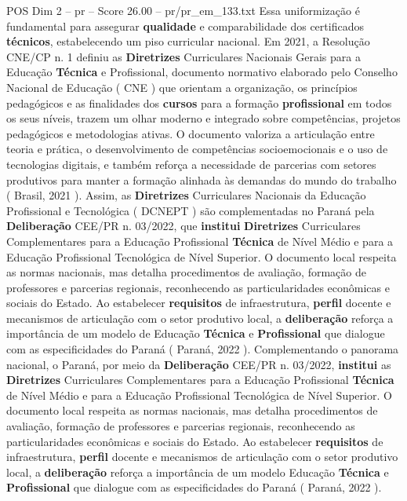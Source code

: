 \begin{textsample}{POS Dim 2 – pr – Score 26.00 – pr/pr\_em\_133.txt}
Essa uniformização é fundamental para assegurar \textbf{qualidade} e comparabilidade dos certificados \textbf{técnicos}, estabelecendo um piso curricular nacional.
Em 2021, a Resolução CNE/CP n. 1 definiu as \textbf{Diretrizes} Curriculares Nacionais Gerais para a Educação \textbf{Técnica} e Profissional, documento normativo elaborado pelo Conselho Nacional de Educação ( CNE ) que orientam a organização, os princípios pedagógicos e as finalidades dos \textbf{cursos} para a formação \textbf{profissional} em todos os seus níveis, trazem um olhar moderno e integrado sobre competências, projetos pedagógicos e metodologias ativas.
O documento valoriza a articulação entre teoria e prática, o desenvolvimento de competências socioemocionais e o uso de tecnologias digitais, e também reforça a necessidade de parcerias com setores produtivos para manter a formação alinhada às demandas do mundo do trabalho ( Brasil, 2021 ).
Assim, as \textbf{Diretrizes} Curriculares Nacionais da Educação Profissional e Tecnológica ( DCNEPT ) são complementadas no Paraná pela \textbf{Deliberação} CEE/PR n. 03/2022, que \textbf{institui} \textbf{Diretrizes} Curriculares Complementares para a Educação Profissional \textbf{Técnica} de Nível Médio e para a Educação Profissional Tecnológica de Nível Superior.
O documento local respeita as normas nacionais, mas detalha procedimentos de avaliação, formação de professores e parcerias regionais, reconhecendo as particularidades econômicas e sociais do Estado.
Ao estabelecer \textbf{requisitos} de infraestrutura, \textbf{perfil} docente e mecanismos de articulação com o setor produtivo local, a \textbf{deliberação} reforça a importância de um modelo de Educação \textbf{Técnica} e \textbf{Profissional} que dialogue com as especificidades do Paraná ( Paraná, 2022 ).
Complementando o panorama nacional, o Paraná, por meio da \textbf{Deliberação} CEE/PR n. 03/2022, \textbf{institui} as \textbf{Diretrizes} Curriculares Complementares para a Educação Profissional \textbf{Técnica} de Nível Médio e para a Educação Profissional Tecnológica de Nível Superior.
O documento local respeita as normas nacionais, mas detalha procedimentos de avaliação, formação de professores e parcerias regionais, reconhecendo as particularidades econômicas e sociais do Estado.
Ao estabelecer \textbf{requisitos} de infraestrutura, \textbf{perfil} docente e mecanismos de articulação com o setor produtivo local, a \textbf{deliberação} reforça a importância de um modelo Educação \textbf{Técnica} e \textbf{Profissional} que dialogue com as especificidades do Paraná ( Paraná, 2022 ).

\end{textsample}
